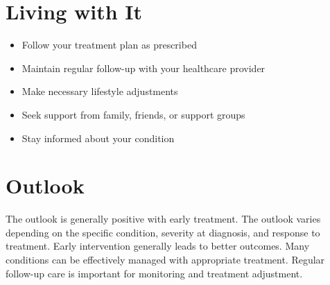\section{Living with It}
\begin{itemize}[noitemsep]
  \item Follow your treatment plan as prescribed
  \item Maintain regular follow-up with your healthcare provider
  \item Make necessary lifestyle adjustments
  \item Seek support from family, friends, or support groups
  \item Stay informed about your condition
\end{itemize}
\section{Outlook}
The outlook is generally positive with early treatment. The outlook varies depending on the specific condition, severity at diagnosis, and response to treatment. Early intervention generally leads to better outcomes. Many conditions can be effectively managed with appropriate treatment. Regular follow-up care is important for monitoring and treatment adjustment.
